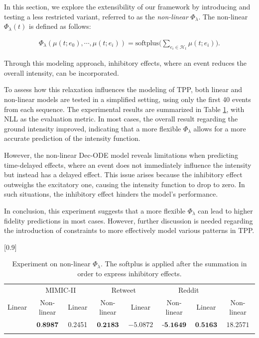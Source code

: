 In this section, we explore the extensibility of our framework by introducing and testing a less restricted variant, referred to as the \textit{non-linear} $\Phi_\lambda$.  
The non-linear $\Phi_\lambda(t)$ is defined as follows:

\begin{align}
    \Phi_\lambda(\mu(t;e_0), \cdots, \mu(t;e_i)) = \text{softplus} \bigg( \sum _{e_i \in \mathcal{H}_{t}}  \mu  (t; e_i) \bigg).
\end{align}

Through this modeling approach, inhibitory effects, where an event reduces the overall intensity, can be incorporated.

To assess how this relaxation influences the modeling of TPP, both linear and non-linear models are tested in a simplified setting, using only the first 40 events from each sequence. The experimental results are summarized in Table \ref{tab:nonlin}, with NLL as the evaluation metric.  
In most cases, the overall result regarding the ground intensity improved, indicating that a more flexible $\Phi_\lambda$ allows for a more accurate prediction of the intensity function.

However, the non-linear Dec-ODE model reveals limitations when predicting time-delayed effects, where an event does not immediately influence the intensity but instead has a delayed effect. This issue arises because the inhibitory effect outweighs the excitatory one, causing the intensity function to drop to zero. In such situations, the inhibitory effect hinders the model's performance.

In conclusion, this experiment suggests that a more flexible $\Phi_\lambda$ can lead to higher fidelity predictions in most cases. However, further discussion is needed regarding the introduction of constraints to more effectively model various patterns in TPP.


\begin{table}[h]
\centering
\caption{Experiment on non-linear $\Phi_\lambda$. The softplus is applied after the summation in order to express inhibitory effects.}
\scalebox{0.9}[0.9]{
\begin{tabular}{cc | cc| c c | cc } \Xhline{0.3ex}
\multicolumn{2}{c|}{StackOverflow} & \multicolumn{2}{c|}{MIMIC-II} & \multicolumn{2}{c|}{Retweet} & \multicolumn{2}{c}{Reddit}\\[-2pt]
Linear & Non-linear &  Linear & Non-linear  &  Linear & Non-linear  & Linear & Non-linear\\
\hline
\multirow{1}{*}{} $0.9948$ & $\textbf{0.8987}$ &0.2451 & $\textbf{0.2183}$ & $-5.0872$ & $\textbf{-5.1649}$ & $\textbf{0.5163}$ & $18.2571$ \\
\Xhline{0.3ex}      
\end{tabular}}
    \label{tab:nonlin}
\end{table}

